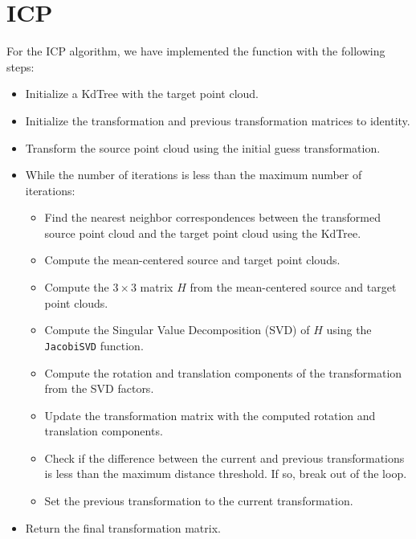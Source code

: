 \section{ICP}
For the ICP algorithm, we have implemented the function with the following steps:
\begin{itemize}
    \item Initialize a KdTree with the target point cloud.
    \item Initialize the transformation and previous transformation matrices to identity.
    \item Transform the source point cloud using the initial guess transformation.
    \item While the number of iterations is less than the maximum number of iterations: 
    \begin{itemize}
        \item Find the nearest neighbor correspondences between the transformed source point cloud and the target point cloud using the KdTree. 
        \item Compute the mean-centered source and target point clouds. 
        \item Compute the $3 \times 3$ matrix $H$ from the mean-centered source and target point clouds. 
        \item Compute the Singular Value Decomposition (SVD) of $H$ using the \texttt{JacobiSVD} function. 
        \item Compute the rotation and translation components of the transformation from the SVD factors. 
        \item Update the transformation matrix with the computed rotation and translation components. 
        \item Check if the difference between the current and previous transformations is less than the maximum distance threshold. If so, break out of the loop. 
        \item Set the previous transformation to the current transformation.
    \end{itemize}
    \item Return the final transformation matrix.
\end{itemize}